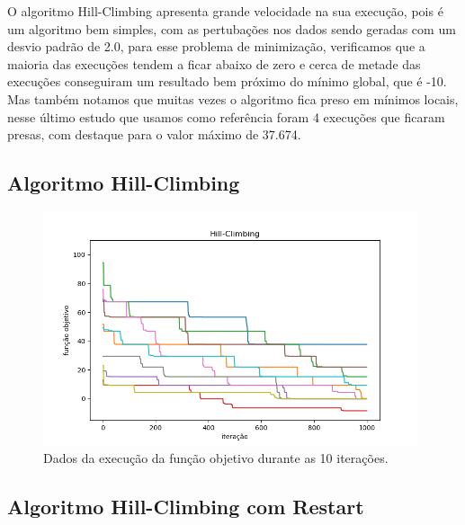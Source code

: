 O algoritmo Hill-Climbing apresenta grande velocidade na sua execução, pois é um algoritmo bem simples, com as pertubações nos dados sendo geradas com um desvio padrão de 2.0, para esse problema de minimização, verificamos que a maioria das execuções tendem a ficar abaixo de zero e cerca de metade das execuções conseguiram um resultado bem próximo do mínimo global, que é -10. Mas também notamos que muitas vezes o algoritmo fica preso em mínimos locais, nesse último estudo que usamos como referência foram 4 execuções que ficaram presas, com destaque para o valor máximo de 37.674.

\subsection{Algoritmo Hill-Climbing}

\begin{figure}[H]
\centering
\includegraphics[width=110mm]{imagens/otima/problema-1-hill-climbing-funcao-objetivo-best.png}
\caption{Dados da execução da função objetivo durante as 10 iterações.
\label{fig:problema-1-hill-climbing-funcao-objetivo}}
\end{figure}

\subsection{Algoritmo Hill-Climbing com Restart}


